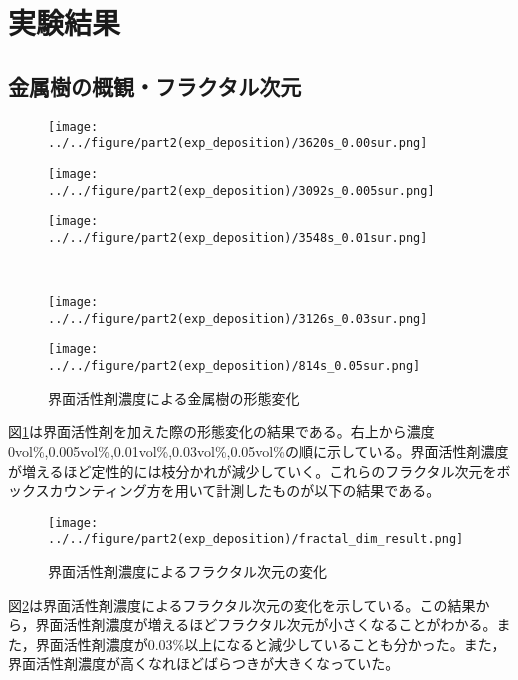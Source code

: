 \documentclass[autodetect-engine,dvi=dvipdfmx,a4paper,ja=standard,oneside,openany,11pt,draft]{bxjsbook}
\begin{document}
\section{実験結果}
\subsection{金属樹の概観・フラクタル次元}
\begin{figure}[H]
  \begin{minipage}
    {0.32\textwidth}
    \centering
    \texttt{[image: ../../figure/part2(exp\_deposition)/3620s\_0.00sur.png]}
    \label{fig:non_surfactant}
  \end{minipage}
  \begin{minipage}
    {0.32\textwidth}
    \centering
    \texttt{[image: ../../figure/part2(exp\_deposition)/3092s\_0.005sur.png]}
    \label{fig:0.005_surfactant}
  \end{minipage}
  \begin{minipage}
    {0.32\textwidth}
    \centering
    \texttt{[image: ../../figure/part2(exp\_deposition)/3548s\_0.01sur.png]}
    \label{fig:0.01_surfactant}
  \end{minipage}
  \\
  \begin{minipage}
    {0.32\textwidth}
    \centering
    \texttt{[image: ../../figure/part2(exp\_deposition)/3126s\_0.03sur.png]}
    \label{fig:0.03_surfactant}
  \end{minipage}
  \begin{minipage}
    {0.32\textwidth}
    \centering
    \texttt{[image: ../../figure/part2(exp\_deposition)/814s\_0.05sur.png]}
    \label{fig:0.05_surfactant}
  \end{minipage}
  \caption{界面活性剤濃度による金属樹の形態変化}
  \label{fig:surfactant}
\end{figure}
図\ref{fig:surfactant}は界面活性剤を加えた際の形態変化の結果である。右上から濃度0vol\%,0.005vol\%,0.01vol\%,0.03vol\%,0.05vol\%の順に示している。界面活性剤濃度が増えるほど定性的には枝分かれが減少していく。これらのフラクタル次元をボックスカウンティング方を用いて計測したものが以下の結果である。
\begin{figure}[H]
  \centering
  \texttt{[image: ../../figure/part2(exp\_deposition)/fractal\_dim\_result.png]}
  \caption{界面活性剤濃度によるフラクタル次元の変化}
  \label{fig:fractal_dim}
\end{figure}
図\ref{fig:fractal_dim}は界面活性剤濃度によるフラクタル次元の変化を示している。この結果から，界面活性剤濃度が増えるほどフラクタル次元が小さくなることがわかる。また，界面活性剤濃度が0.03\%以上になると減少していることも分かった。また，界面活性剤濃度が高くなれほどばらつきが大きくなっていた。
\end{document}
